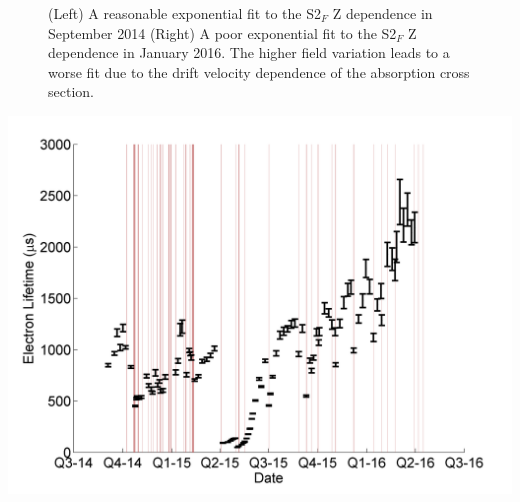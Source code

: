 \documentclass[a4paper,12pt]{article}
\begin{document}
{\begin{figure} 
\centering
{}
\qquad
{}
\caption{ (Left) A reasonable exponential fit to the S2$_F$ Z dependence in September 2014 (Right) A poor exponential fit to the S2$_F$ Z dependence in January 2016.  The higher field variation leads to a worse fit due to the drift velocity dependence of the absorption cross section.}
\label{ELFits}
\end{figure}


\newpage

\begin{center}
\includegraphics[scale=0.5]{Run04Corrections/LUX_eLifetime_Kr2p22.png}
 \label{fig:KrypCalFieldStrength}
\end{center}


}
\end{document}
